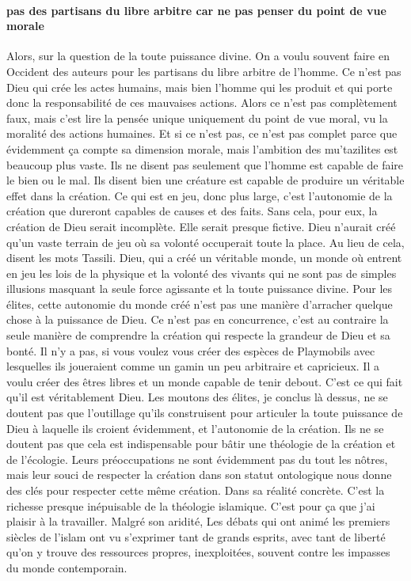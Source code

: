 \paragraph{pas des partisans du libre arbitre car ne pas penser du point de vue morale} Alors, sur la question de la toute puissance divine. On a voulu souvent faire en Occident des auteurs pour les partisans du libre arbitre de l'homme. Ce n'est pas Dieu qui crée les actes humains, mais bien l'homme qui les produit et qui porte donc la responsabilité de ces mauvaises actions. Alors ce n'est pas complètement faux, mais c'est lire la pensée unique uniquement du point de vue moral, vu la moralité des actions humaines.
Et si ce n'est pas, ce n'est pas complet parce que évidemment ça compte sa dimension morale, mais l'ambition des mu'tazilites est beaucoup plus vaste. Ils ne disent pas seulement que l'homme est capable de faire le bien ou le mal. Ils disent bien une créature est capable de produire un véritable effet dans la création. Ce qui est en jeu, donc plus large, c'est l'autonomie de la création que dureront capables de causes et des faits.
Sans cela, pour eux, la création de Dieu serait incomplète. Elle serait presque fictive. Dieu n'aurait créé qu'un vaste terrain de jeu où sa volonté occuperait toute la place. Au lieu de cela, disent les mots Tassili. Dieu, qui a créé un véritable monde, un monde où entrent en jeu les lois de la physique et la volonté des vivants qui ne sont pas de simples illusions masquant la seule force agissante et la toute puissance divine.
Pour les élites, cette autonomie du monde créé n'est pas une manière d'arracher quelque chose à la puissance de Dieu. Ce n'est pas en concurrence, c'est au contraire la seule manière de comprendre la création qui respecte la grandeur de Dieu et sa bonté. Il n'y a pas, si vous voulez vous créer des espèces de Playmobils avec lesquelles ils joueraient comme un gamin un peu arbitraire et capricieux.
Il a voulu créer des êtres libres et un monde capable de tenir debout. C'est ce qui fait qu'il est véritablement Dieu. Les moutons des élites, je conclus là dessus, ne se doutent pas que l'outillage qu'ils construisent pour articuler la toute puissance de Dieu à laquelle ils croient évidemment, et l'autonomie de la création. Ils ne se doutent pas que cela est indispensable pour bâtir une théologie de la création et de l'écologie.
Leurs préoccupations ne sont évidemment pas du tout les nôtres, mais leur souci de respecter la création dans son statut ontologique nous donne des clés pour respecter cette même création. Dans sa réalité concrète. C'est la richesse presque inépuisable de la théologie islamique. C'est pour ça que j'ai plaisir à la travailler. Malgré son aridité, Les débats qui ont animé les premiers siècles de l'islam ont vu s'exprimer tant de grands esprits, avec tant de liberté qu'on y trouve des ressources propres, inexploitées, souvent contre les impasses du monde contemporain.


